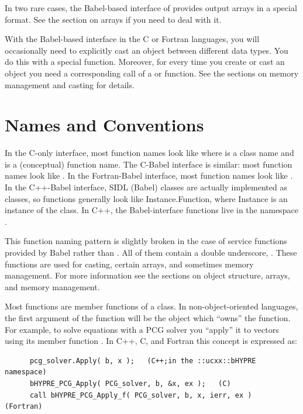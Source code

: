 In two rare cases, the Babel-based interface of \hypre{} provides
output arrays in a special format.  See the section on arrays if you
need to deal with it.

With the Babel-based interface in the C or Fortran languages, you will
occasionally need to explicitly cast an object between different data
types.  You do this with a special  function.  Moreover,
for every time you create or cast an object you need a corresponding
call of a  or  function. See the
sections on memory management and casting for details.


\section{Names and Conventions}

In the C-only interface, most \hypre{} function names look like
 where  is a class name and
 is a (conceptual) function name.  The C-Babel
interface is similar: most function names look like
.  In the Fortran-Babel interface, most
function names look like .  In the
C++-Babel interface, SIDL (Babel) classes are actually implemented as
classes, so functions generally look like Instance.Function, where
Instance is an instance of the class.  In C++, the
Babel-interface functions live in the namespace .

This function naming pattern is slightly broken in the case of service
functions provided by Babel rather than \hypre{}.  All of them contain
a double underscore, \code{__}.  These functions are used for casting,
certain arrays, and sometimes memory management.  For more information
see the sections on object structure, arrays, and memory management.

Most functions are member functions of a class.  In
non-object-oriented languages, the first argument of the function will
be the object which ``owns'' the function.  For example, to solve
equations with a PCG solver you ``apply'' it to vectors using its
member function .  In C++, C, and Fortran this concept is
expressed as:
\begin{verbatim}
      pcg_solver.Apply( b, x );   (C++;in the ::ucxx::bHYPRE namespace)
      bHYPRE_PCG_Apply( PCG_solver, b, &x, ex );   (C)
      call bHYPRE_PCG_Apply_f( PCG_solver, b, x, ierr, ex )   (Fortran)
\end{verbatim}

